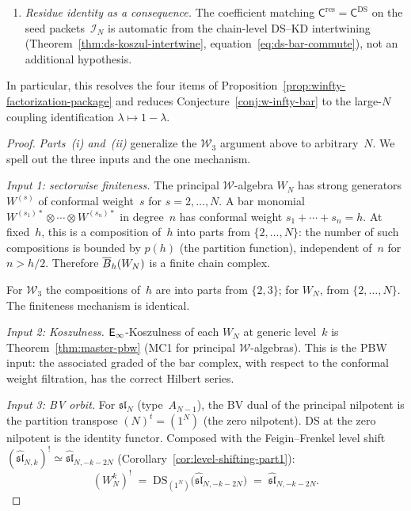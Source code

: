 \begin{theorem}
\begin{enumerate}[label=\textup{(\roman*)}]
\item \emph{Residue identity as a consequence.}
  The coefficient matching
  $\mathsf{C}^{\mathrm{res}} = \mathsf{C}^{\mathrm{DS}}$
  on the seed packets~$\mathcal{I}_N$ is automatic from the
  chain-level DS--KD intertwining
  \textup{(}Theorem~\textup{\ref{thm:ds-koszul-intertwine}},
  equation~\textup{\eqref{eq:ds-bar-commute})},
  not an additional hypothesis.
\end{enumerate}
In particular, this resolves the four items of
Proposition~\textup{\ref{prop:winfty-factorization-package}}
and reduces Conjecture~\textup{\ref{conj:w-infty-bar}} to the
large-$N$ coupling identification
$\lambda \mapsto 1 - \lambda$.
\end{theorem}

\begin{proof}
\emph{Parts~(i) and~(ii)} generalize the $\mathcal{W}_3$ argument
above to arbitrary~$N$.  We spell out the three inputs and the one
mechanism.

\emph{Input 1: sectorwise finiteness.}
The principal $\mathcal{W}$-algebra $W_N$ has strong generators
$W^{(s)}$ of conformal weight~$s$ for $s = 2, \ldots, N$.  A bar
monomial $W^{(s_1)*} \otimes \cdots \otimes W^{(s_n)*}$ in
degree~$n$ has conformal weight $s_1 + \cdots + s_n = h$.  At
fixed~$h$, this is a composition of~$h$ into parts from
$\{2, \ldots, N\}$: the number of such compositions is bounded
by $p(h)$ (the partition function), independent of~$n$ for
$n > h/2$.  Therefore $\overline{B}_h(W_N)$ is a finite chain complex.

For $\mathcal{W}_3$ the compositions of~$h$ are into parts from
$\{2,3\}$; for $W_N$, from $\{2, \ldots, N\}$.  The finiteness
mechanism is identical.

\emph{Input 2: Koszulness.}
$\mathsf{E}_{\infty}$-Koszulness of each $W_N$ at generic level~$k$ is
Theorem~\ref{thm:master-pbw} (MC1 for principal
$\mathcal{W}$-algebras).  This is the PBW input: the associated
graded of the bar complex, with respect to the conformal weight
filtration, has the correct Hilbert series.

\emph{Input 3: BV orbit.}
For $\mathfrak{sl}_N$ (type~$A_{N-1}$), the BV dual of
the principal nilpotent is the partition transpose
$(N)^t = (1^N)$ (the zero nilpotent).  DS at the zero nilpotent
is the identity functor.  Composed with the Feigin--Frenkel
level shift
$(\widehat{\mathfrak{sl}}_{N,k})^!
\simeq \widehat{\mathfrak{sl}}_{N,-k-2N}$
(Corollary~\ref{cor:level-shifting-part1}):
\[
(W_N^k)^!
\;=\;
\mathrm{DS}_{(1^N)}\bigl(
\widehat{\mathfrak{sl}}_{N,-k-2N}
\bigr)
\;=\;
\widehat{\mathfrak{sl}}_{N,-k-2N}.
\]


\end{proof}
